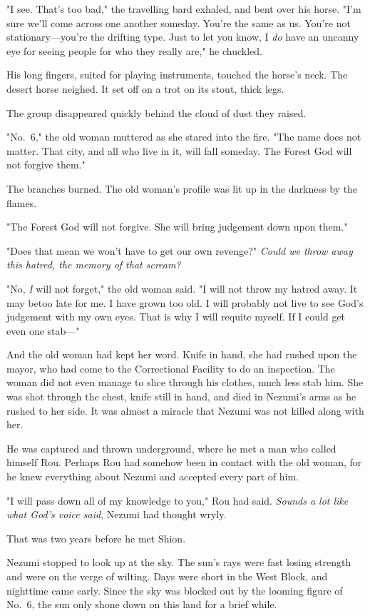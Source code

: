"I see. That's too bad," the travelling bard exhaled, and bent over his
horse. "I'm sure we'll come across one another someday. You're the same
as us. You're not stationary---you're the drifting type. Just to let you
know, I \emph{do} have an uncanny eye for seeing people for who they really
are," he chuckled.

His long fingers, suited for playing instruments, touched the horse's
neck. The desert horse neighed. It set off on a trot on its stout, thick
legs.

The group disappeared quickly behind the cloud of dust they raised.

"No.~6," the old woman muttered as she stared into the fire. "The name
does not matter. That city, and all who live in it, will fall someday.
The Forest God will not forgive them."

The branches burned. The old woman's profile was lit up in the darkness
by the flames.

"The Forest God will not forgive. She will bring judgement down upon
them."

"Does that mean we won't have to get our own revenge?" \emph{Could we throw
away this hatred, the memory of that scream?}

"No, \emph{I} will not forget," the old woman said. "I will not throw my hatred
away. It may be\el too late for me. I have grown too old. I will
probably not live to see God's judgement with my own eyes. That is why I
will requite myself. If I could get even one stab---"

And the old woman had kept her word. Knife in hand, she had rushed upon
the mayor, who had come to the Correctional Facility to do an
inspection. The woman did not even manage to slice through his clothes,
much less stab him. She was shot through the chest, knife still in hand,
and died in Nezumi's arms as he rushed to her side. It was almost a
miracle that Nezumi was not killed along with her.

He was captured and thrown underground, where he met a man who called
himself Rou. Perhaps Rou had somehow been in contact with the old woman,
for he knew everything about Nezumi and accepted every part of him.

"I will pass down all of my knowledge to you," Rou had said. \emph{Sounds a
lot like what God's voice said}, Nezumi had thought wryly.

That was two years before he met Shion.

\mybreak

Nezumi stopped to look up at the sky. The sun's rays were fast losing
strength and were on the verge of wilting. Days were short in the West
Block, and nighttime came early. Since the sky was blocked out by the
looming figure of No.~6, the sun only shone down on this land for a
brief while.

